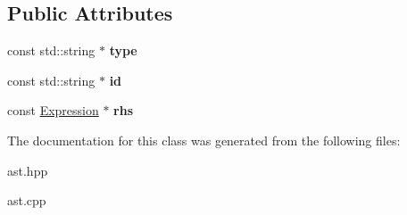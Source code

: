 \subsection*{Public Attributes}
\begin{DoxyCompactItemize}
\item 
\mbox{\label{class_var_dec_a389a60f027a4359d27fe550cd30bad4e}} 
const std\+::string $\ast$ {\bfseries type}
\item 
\mbox{\label{class_var_dec_a5907906a3dff56774adf2f9d2822fd9a}} 
const std\+::string $\ast$ {\bfseries id}
\item 
\mbox{\label{class_var_dec_afce3b9ef23092a1aab5a649df5c1ee5b}} 
const \hyperlink{class_expression}{Expression} $\ast$ {\bfseries rhs}
\end{DoxyCompactItemize}


The documentation for this class was generated from the following files\+:\begin{DoxyCompactItemize}
\item 
ast.\+hpp\item 
ast.\+cpp\end{DoxyCompactItemize}
